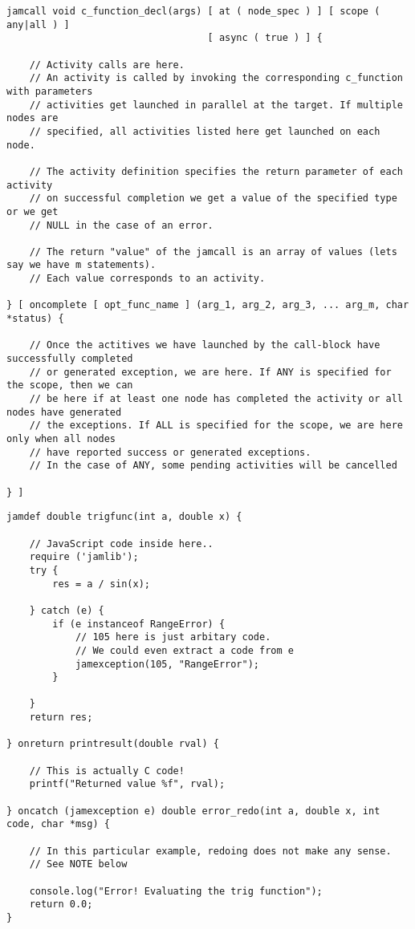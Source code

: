 \documentclass[11pt]{article}
\begin{document}
\begin{lstlisting}[caption=Syntax of the activity control construct, label=activity_control]
jamcall void c_function_decl(args) [ at ( node_spec ) ] [ scope ( any|all ) ]
                                   [ async ( true ) ] {

    // Activity calls are here.
    // An activity is called by invoking the corresponding c_function with parameters
    // activities get launched in parallel at the target. If multiple nodes are
    // specified, all activities listed here get launched on each node.

    // The activity definition specifies the return parameter of each activity
    // on successful completion we get a value of the specified type or we get
    // NULL in the case of an error.

    // The return "value" of the jamcall is an array of values (lets say we have m statements).
    // Each value corresponds to an activity.

} [ oncomplete [ opt_func_name ] (arg_1, arg_2, arg_3, ... arg_m, char *status) {

    // Once the actitives we have launched by the call-block have successfully completed
    // or generated exception, we are here. If ANY is specified for the scope, then we can
    // be here if at least one node has completed the activity or all nodes have generated
    // the exceptions. If ALL is specified for the scope, we are here only when all nodes
    // have reported success or generated exceptions.
    // In the case of ANY, some pending activities will be cancelled

} ]
\end{lstlisting}




\begin{lstlisting}[caption=An activity definition example,label=lst2]
jamdef double trigfunc(int a, double x) {

    // JavaScript code inside here..
    require ('jamlib');
    try {
        res = a / sin(x);

    } catch (e) {
        if (e instanceof RangeError) {
            // 105 here is just arbitary code.
            // We could even extract a code from e
            jamexception(105, "RangeError");
        }

    }
    return res;

} onreturn printresult(double rval) {

    // This is actually C code!
    printf("Returned value %f", rval);

} oncatch (jamexception e) double error_redo(int a, double x, int code, char *msg) {

    // In this particular example, redoing does not make any sense.
    // See NOTE below

    console.log("Error! Evaluating the trig function");
    return 0.0;
}
\end{lstlisting}
\end{document}
